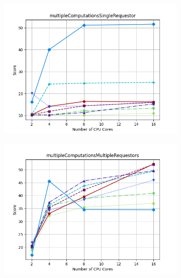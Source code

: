 \documentclass{article}
\begin{document}
\begin{figure}[H]
    \begin{subfigure}[b]{0.48\textwidth}
        \includegraphics[width=\linewidth]{plots/multipleComputationsSingleRequestor.png}
    \end{subfigure}
    \begin{subfigure}[b]{0.48\textwidth}
        \includegraphics[width=\linewidth]{plots/multipleComputationsMultipleRequestors.png}
    \end{subfigure}

    \vspace{1em}


\end{figure}
\end{document}
